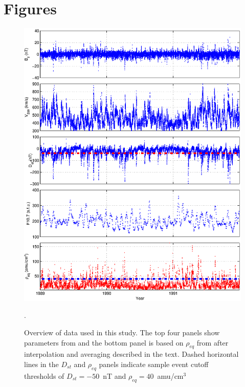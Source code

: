 \documentclass[10pt,twocolumn]{article}
\begin{document}
\newpage
\footnotesize



\clearpage
\section{Figures}

\begin{figure}[htp!]
\centering
\includegraphics[scale=0.45]{paperfigures/alldata.eps}
\caption{Overview of data used in this study. The top four panels show parameters from \cite{Reconstruction} and the bottom panel is based on $\rho_{eq}$ from \cite{Denton} after interpolation and averaging described in the text. Dashed horizontal lines in the $D_{st}$ and $\rho_{eq}$ panels indicate sample event cutoff thresholds of $D_{st}=-50$~nT and $\rho_{eq}=40$~amu/cm$^3$}.
\label{AllData}
\end{figure}
\end{document}
